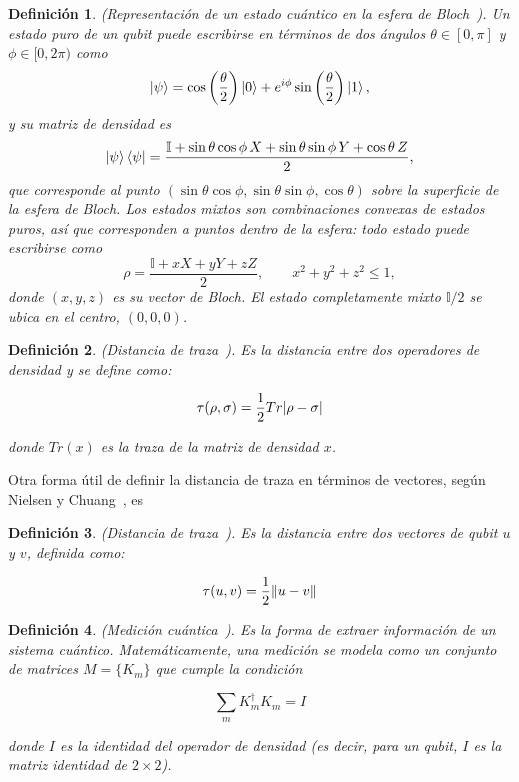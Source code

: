 \documentclass{ieeeaccess}
\newtheorem{definition}{Definición}[section]
\begin{document}
\begin{definition}
  (Representación de un estado cuántico en la esfera de Bloch~\cite{watrous_bloch_sphere}). Un estado puro de un qubit puede escribirse en términos de dos ángulos $\theta \in [0, \pi]$ y $\phi \in [0, 2\pi)$ como
  \[
    \ket{\psi} = \cos\left(\frac{\theta}{2}\right)\ket{0} + e^{i\phi}\sin\left(\frac{\theta}{2}\right)\ket{1},
  \]
  y su matriz de densidad es
  \[
    \ket{\psi}\bra{\psi} = \frac{\mathbb{I} + \sin\theta\cos\phi\, X + \sin\theta\sin\phi\, Y + \cos\theta\, Z}{2},
  \]
  que corresponde al punto $(\sin\theta\cos\phi, \sin\theta\sin\phi, \cos\theta)$ sobre la superficie de la esfera de Bloch. Los estados mixtos son combinaciones convexas de estados puros, así que corresponden a puntos dentro de la esfera: todo estado puede escribirse como
  \[
    \rho = \frac{\mathbb{I} + xX + yY + zZ}{2}, \qquad x^2 + y^2 + z^2 \leq 1,
  \]
  donde $(x, y, z)$ es su vector de Bloch. El estado completamente mixto $\mathbb{I}/2$ se ubica en el centro, $(0, 0, 0)$.
  \label{def:bloch_representation}
\end{definition}

\begin{definition}
    (Distancia de traza~\cite{zhou2017differential}). Es la distancia entre dos operadores de densidad y se define como:

    \[
      \tau(\rho, \sigma) = \frac{1}{2}Tr\abs{\rho - \sigma}
    \]

    donde $Tr(x)$ es la traza de la matriz de densidad $x$.
    \label{def:trace_distance}
\end{definition}

Otra forma útil de definir la distancia de traza en términos de vectores, según Nielsen y Chuang~\cite{Nielsen_Chuang_2010}, es

\begin{definition}
    (Distancia de traza~\cite{Nielsen_Chuang_2010}). Es la distancia entre dos vectores de qubit $u$ y $v$, definida como:

    \[
      \tau(u, v) = \frac{1}{2}\norm{u - v}
    \]
    \label{def:trace_distance_vector}
\end{definition}

\begin{definition}
    (Medición cuántica~\cite{zhou2017differential}). Es la forma de extraer información de un sistema cuántico. Matemáticamente, una medición se modela como un conjunto de matrices $M = \{K_m\}$ que cumple la condición

    \[
      \sum_m K^{\dagger}_{m}K_{m} = I
    \]

    donde $I$ es la identidad del operador de densidad (es decir, para un qubit, $I$ es la matriz identidad de $2\times2$).
    \label{def:quantum_measurement}
\end{definition}
\end{document}
